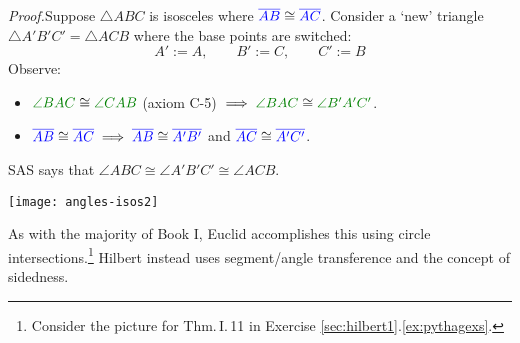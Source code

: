 \begin{tcolorbox}[proofstyle]
	\begin{minipage}[t]{0.7\linewidth}\vspace{0pt}
		\emph{Proof.}\lstsp Suppose $\triangle ABC$ is isosceles where $\textcolor{blue}{\overline{AB}}\cong\textcolor{blue}{\overline{AC}}$. Consider a `new' triangle $\triangle A'B'C'=\triangle ACB$ where the base points are switched:
		\[
			A':=A,\qquad B':=C,\qquad C':=B
		\]
		Observe:
		\begin{itemize}
		  \item $\textcolor{Green}{\angle BAC}\cong\textcolor{Green}{\angle CAB}$ (axiom C-5) $\implies\textcolor{Green}{\angle BAC}\cong\textcolor{Green}{\angle B'A'C'}$.
		  \item $\textcolor{blue}{\overline{AB}}\cong\textcolor{blue}{\overline{AC}}\implies \textcolor{blue}{\overline{AB}}\cong\textcolor{blue}{\overline{A'B'}}$ and $\textcolor{blue}{\overline{AC}}\cong\textcolor{blue}{\overline{A'C'}}$.
		\end{itemize}
		SAS says that $\angle ABC\cong\angle A'B'C'\cong\angle ACB$.
	\end{minipage}
	\hfill
	\begin{minipage}[t]{0.29\linewidth}\vspace{0pt}
		\flushright
		\texttt{[image: angles-isos2]}\\[-8pt]
		\hfill\qedsymbol
	\end{minipage}
\end{tcolorbox}


\goodbreak



As with the majority of Book I, Euclid accomplishes this using circle intersections.\footnote{Consider the picture for Thm.\,I.\,11 in Exercise \ref*{sec:hilbert1}.\ref{ex:pythagexs}.} Hilbert instead uses segment/angle transference and the concept of sidedness.\par
	
